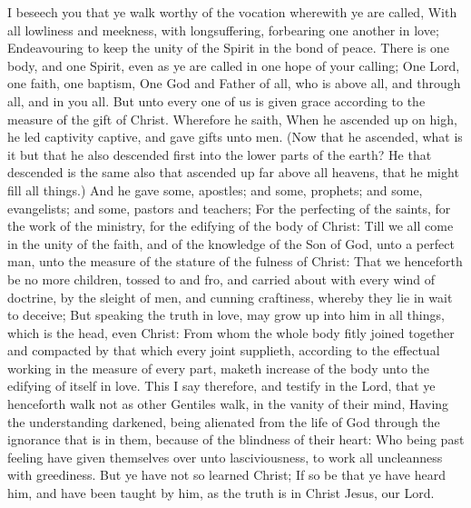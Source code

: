  I beseech you that ye walk worthy of the vocation wherewith ye are called, With all lowliness and meekness, with longsuffering, forbearing one another in love; Endeavouring to keep the unity of the Spirit in the bond of peace. There is one body, and one Spirit, even as ye are called in one hope of your calling; One Lord, one faith, one baptism, One God and Father of all, who is above all, and through all, and in you all. But unto every one of us is given grace according to the measure of the gift of Christ. Wherefore he saith, When he ascended up on high, he led captivity captive, and gave gifts unto men. (Now that he ascended, what is it but that he also descended first into the lower parts of the earth? He that descended is the same also that ascended up far above all heavens, that he might fill all things.) And he gave some, apostles; and some, prophets; and some, evangelists; and some, pastors and teachers; For the perfecting of the saints, for the work of the ministry, for the edifying of the body of Christ: Till we all come in the unity of the faith, and of the knowledge of the Son of God, unto a perfect man, unto the measure of the stature of the fulness of Christ: That we henceforth be no more children, tossed to and fro, and carried about with every wind of doctrine, by the sleight of men, and cunning craftiness, whereby they lie in wait to deceive; But speaking the truth in love, may grow up into him in all things, which is the head, even Christ: From whom the whole body fitly joined together and compacted by that which every joint supplieth, according to the effectual working in the measure of every part, maketh increase of the body unto the edifying of itself in love. This I say therefore, and testify in the Lord, that ye henceforth walk not as other Gentiles walk, in the vanity of their mind, Having the understanding darkened, being alienated from the life of God through the ignorance that is in them, because of the blindness of their heart: Who being past feeling have given themselves over unto lasciviousness, to work all uncleanness with greediness. But ye have not so learned Christ; If so be that ye have heard him, and have been taught by him, as the truth is in Christ Jesus, our Lord.


